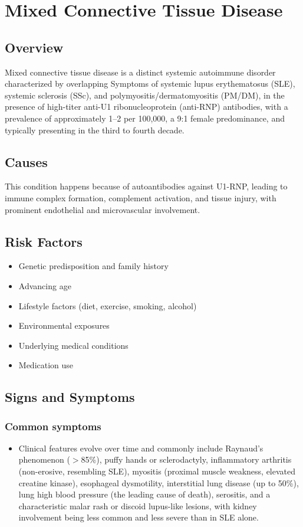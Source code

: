 \chapter{Mixed Connective Tissue Disease}
\label{sec:Mixed Connective Tissue Disease}

\section{Overview}
Mixed connective tissue disease is a distinct systemic autoimmune disorder characterized by overlapping Symptoms of systemic lupus erythematosus (SLE), systemic sclerosis (SSc), and polymyositis/dermatomyositis (PM/DM), in the presence of high-titer anti-U1 ribonucleoprotein (anti-RNP) antibodies, with a prevalence of approximately 1--2 per 100,000, a 9:1 female predominance, and typically presenting in the third to fourth decade.
\section{Causes}
This condition happens because of autoantibodies against U1-RNP, leading to immune complex formation, complement activation, and tissue injury, with prominent endothelial and microvascular involvement.     
\section{Risk Factors}

\begin{itemize}[noitemsep]
  \item Genetic predisposition and family history
  \item Advancing age
  \item Lifestyle factors (diet, exercise, smoking, alcohol)
  \item Environmental exposures
  \item Underlying medical conditions
  \item Medication use
\end{itemize}
\section{Signs and Symptoms}

\subsection{Common symptoms}
\begin{itemize}[noitemsep]
  \item Clinical features evolve over time and commonly include Raynaud's phenomenon ($>$85\%), puffy hands or sclerodactyly, inflammatory arthritis (non-erosive, resembling SLE), myositis (proximal muscle weakness, elevated creatine kinase), esophageal dysmotility, interstitial lung disease (up to 50\%), lung high blood pressure (the leading cause of death), serositis, and a characteristic malar rash or discoid lupus-like lesions, with kidney involvement being less common and less severe than in SLE alone. 
  \end{itemize}

